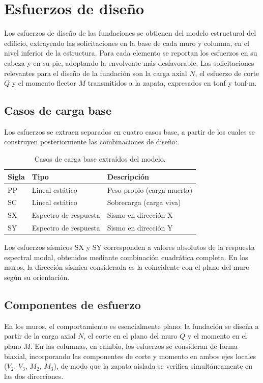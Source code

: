 \section{Esfuerzos de diseño}

Los esfuerzos de diseño de las fundaciones se obtienen del modelo estructural del edificio, extrayendo las solicitaciones en la base de cada muro y columna, en el nivel inferior de la estructura. Para cada elemento se reportan los esfuerzos en su cabeza y en su pie, adoptando la envolvente más desfavorable. Las solicitaciones relevantes para el diseño de la fundación son la carga axial $N$, el esfuerzo de corte $Q$ y el momento flector $M$ transmitidos a la zapata, expresados en tonf y tonf$\cdot$m.

\subsection{Casos de carga base}
Los esfuerzos se extraen separados en cuatro casos base, a partir de los cuales se construyen posteriormente las combinaciones de diseño:

\begin{table}[H]
\centering
\caption{Casos de carga base extraídos del modelo.}
\label{tab:casos_base}
\begin{tabular}{lll}
\hline
Sigla & Tipo & Descripción \\
\hline
PP & Lineal estático & Peso propio (carga muerta) \\
SC & Lineal estático & Sobrecarga (carga viva) \\
SX & Espectro de respuesta & Sismo en dirección X \\
SY & Espectro de respuesta & Sismo en dirección Y \\
\hline
\end{tabular}
\end{table}

Los esfuerzos sísmicos SX y SY corresponden a valores absolutos de la respuesta espectral modal, obtenidos mediante combinación cuadrática completa. En los muros, la dirección sísmica considerada es la coincidente con el plano del muro según su orientación.

\subsection{Componentes de esfuerzo}
En los muros, el comportamiento es esencialmente plano: la fundación se diseña a partir de la carga axial $N$, el corte en el plano del muro $Q$ y el momento en el plano $M$. En las columnas, en cambio, los esfuerzos se consideran de forma biaxial, incorporando las componentes de corte y momento en ambos ejes locales ($V_2$, $V_3$, $M_2$, $M_3$), de modo que la zapata aislada se verifica simultáneamente en las dos direcciones.

